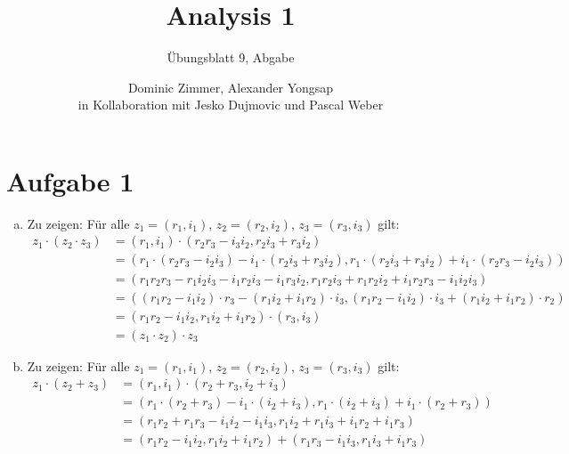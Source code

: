 \documentclass{scrreprt}
\begin{document}
	\title{Analysis 1}
 	\author{Dominic Zimmer, Alexander Yongsap\\in Kollaboration mit Jesko Dujmovic und Pascal Weber}
 	\subtitle{Übungsblatt 9, Abgabe}
 	\publishers{Übungsgruppe: Rami Ahmad}
  	\maketitle 


\section*{Aufgabe 1}
\begin{enumerate}[(a)]
\item
    Zu zeigen: Für alle $z_1 = (r_1, i_1)$, $z_2 = (r_2, i_2)$, $z_3 = (r_3, i_3)$ gilt:
    \begin{align*}
        z_1 \cdot (z_2 \cdot z_3) & = (r_1, i_1) \cdot ( r_2  r_3 - i_3  i_2, r_2  i_3 + r_3  i_2 )\\
        & = (r_1 \cdot (r_2  r_3 - i_2  i_3) - i_1 \cdot (r_2  i_3 + r_3  i_2), r_1 \cdot (r_2  i_3 + r_3  i_2) + i_1 \cdot (r_2  r_3 - i_2  i_3))\\
        & = (r_1 r_2 r_3 - r_1 i_2 i_3 - i_1 r_2 i_3 - i_1 r_3 i_2, r_1 r_2 i_3 + r_1 r_2 i_2 + i_1 r_2 r_3 - i_1 i_2 i_3)\\
        & = ((r_1 r_2 - i_1 i_2) \cdot r_3 - (r_1 i_2 + i_1 r_2) \cdot i_3, (r_1 r_2 - i_1 i_2) \cdot i_3 + (r_1 i_2 + i_1 r_2) \cdot r_2)\\
        & = (r_1 r_2 - i_1 i_2, r_1 i_2 + i_1 r_2) \cdot (r_3, i_3)\\
        & = (z_1 \cdot z_2) \cdot z_3   
    \end{align*}
\item
    Zu zeigen: Für alle $z_1 = (r_1, i_1)$, $z_2 = (r_2, i_2)$, $z_3 = (r_3, i_3)$ gilt:
    \begin{align*}
        z_1 \cdot (z_2 + z_3) & = (r_1, i_1) \cdot (r_2 + r_3, i_2 + i_3)\\
        & = (r_1 \cdot (r_2 + r_3) - i_1 \cdot (i_2 + i_3) , r_1 \cdot (i_2 + i_3) + i_1 \cdot (r_2 + r_3))\\
        & = (r_1 r_2 + r_1 r_3 - i_1 i_2 - i_1 i_3, r_1 i_2 + r_1 i_3 + i_1 r_2 + i_1 r_3)\\
        & = (r_1 r_2 - i_1 i_2, r_1 i_2 + i_1 r_2) + (r_1 r_3 - i_1 i_3, r_1 i_3 + i_1 r_3)\\

\end{align*}
\end{enumerate}
\end{document}
